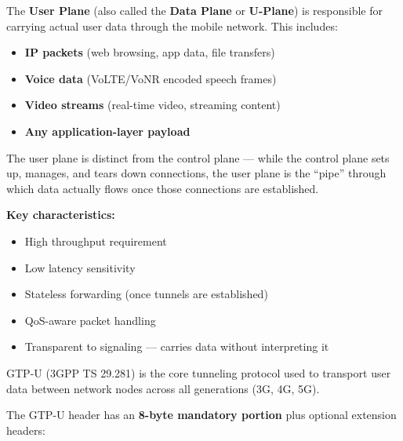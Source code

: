 
The \textbf{User Plane} (also called the \textbf{Data Plane} or \textbf{U-Plane}) is responsible for carrying actual user data through the mobile network. This includes:

\begin{itemize}
\tightlist
\item
  \textbf{IP packets} (web browsing, app data, file transfers)
\item
  \textbf{Voice data} (VoLTE/\allowbreak{}VoNR encoded speech frames)
\item
  \textbf{Video streams} (real-time video, streaming content)
\item
  \textbf{Any application-layer payload}
\end{itemize}

The user plane is distinct from the control plane — while the control plane sets up, manages, and tears down connections, the user plane is the ``pipe'' through which data actually flows once those connections are established.

\textbf{Key characteristics:}

\begin{itemize}
\tightlist
\item
  High throughput requirement
\item
  Low latency sensitivity
\item
  Stateless forwarding (once tunnels are established)
\item
  QoS-aware packet handling
\item
  Transparent to signaling — carries data without interpreting it
\end{itemize}



GTP-U (3GPP TS 29.281) is the core tunneling protocol used to transport user data between network nodes across all generations (3G, 4G, 5G).


The GTP-U header has an \textbf{8-byte mandatory portion} plus optional extension headers:


